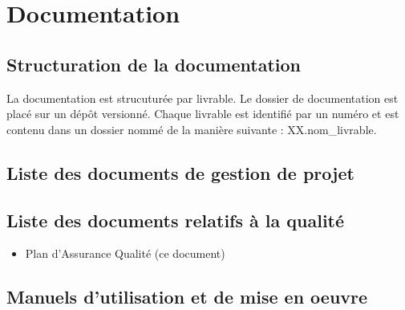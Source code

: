 \section{Documentation}

\subsection{Structuration de la documentation}
La documentation est strucuturée par livrable. Le dossier de documentation est placé sur un dépôt versionné.
Chaque livrable est identifié par un numéro et est contenu dans un dossier nommé de la manière suivante : XX.nom\_livrable.


\subsection{Liste des documents de gestion de projet}


\subsection{Liste des documents relatifs à la qualité}

\begin{itemize}
    \item Plan d'Assurance Qualité (ce document)
\end{itemize}

\subsection{Manuels d'utilisation et de mise en oeuvre}

\vfill
\pagebreak
